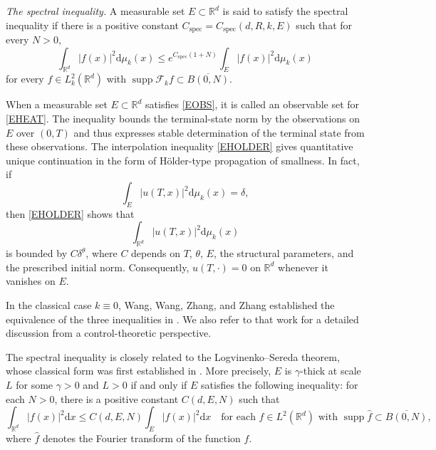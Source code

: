 \documentclass[12pt]{article}
\DeclareMathOperator{\supp}{supp}
\begin{document}
\emph{The spectral inequality.} A measurable set $E \subset \mathbb{R}^d$ is said to satisfy the spectral inequality if there is a positive constant $C_{\mathrm{spec}} = C_{\mathrm{spec}}(d,R,k,E)$ such that for every $N > 0$,
\begin{equation}\label{ESPEC}
\int_{\mathbb{R}^d} |f(x)|^2 \mathrm{d}\mu_k(x)
\le e^{C_{\mathrm{spec}}(1+N)}
\int_{E} |f(x)|^2 \mathrm{d}\mu_k(x)
\end{equation}
for every $f\in L_k^2(\mathbb{R}^d)$ with $\supp\mathcal{F}_k f\subset \overline{B(0,N)}$.

When a measurable set $E\subset \mathbb{R}^d$ satisfies \eqref{EOBS}, it is called an observable set for \eqref{EHEAT}.
The inequality bounds the terminal-state norm by the observations on $E$ over $(0,T)$ and thus expresses stable determination of the terminal state from these observations.
The interpolation inequality \eqref{EHOLDER} gives quantitative unique continuation in the form of H\"older-type propagation of smallness. In fact, if
\[
\int_{E} |u(T,x)|^{2}\mathrm{d}\mu_k(x)=\delta,
\]
then \eqref{EHOLDER} shows that
\[
\int_{\mathbb{R}^{d}} |u(T,x)|^{2}\mathrm{d}\mu_k(x)
\]
is bounded by $C\delta^{\theta}$, where $C$ depends on $T$, $\theta$, $E$, the structural parameters, and the prescribed initial norm. Consequently, $u(T,\cdot)=0$ on $\mathbb{R}^{d}$ whenever it vanishes on $E$.

In the classical case $k\equiv0$, Wang, Wang, Zhang, and Zhang established the equivalence of the three inequalities in \cite{GWW}. We also refer to that work for a detailed discussion from a control-theoretic perspective.

The spectral inequality is closely related to the Logvinenko--Sereda theorem, whose classical form was first established in \cite{LVN}.  More precisely,
 $E$ is $\gamma$-thick at scale $L$ for some $\gamma>0$ and $L>0$ if and only if $E$ satisfies the following inequality: for each $N>0$, there is a positive constant $C(d,E,N)$ such that
\begin{equation}
\int_{\mathbb{R}^{d}} |f(x)|^{2}\mathrm{d}x
\leq C(d,E,N) \int_{E} |f(x)|^{2}\mathrm{d}x
\quad \text{for each } f\in L^{2}(\mathbb{R}^{d}) \text{ with } \supp\widehat{f}\subset \overline{B(0,N)},
\end{equation}
where $\widehat{f}$ denotes the Fourier transform of the function $f$.
\end{document}
